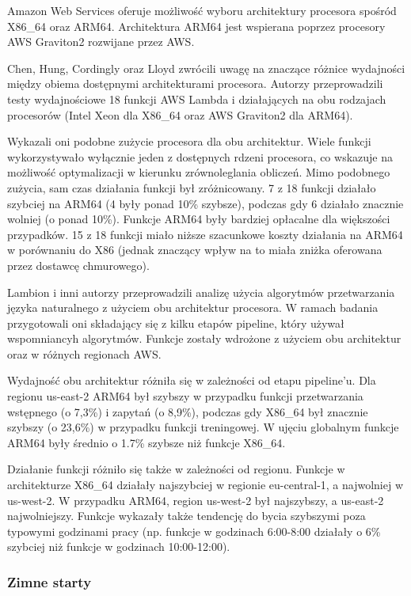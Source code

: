 Amazon Web Services oferuje możliwość wyboru architektury procesora spośród X86\_64 oraz ARM64. Architektura ARM64 jest wspierana poprzez procesory AWS Graviton2 rozwijane przez AWS.

Chen, Hung, Cordingly oraz Lloyd \cite{10.1145/3631295.3631394} zwrócili uwagę na znaczące różnice wydajności między obiema dostępnymi architekturami procesora. Autorzy przeprowadzili testy wydajnościowe 18 funkcji AWS Lambda i działających na obu rodzajach procesorów (Intel Xeon dla X86\_64 oraz AWS Graviton2 dla ARM64). 

Wykazali oni podobne zużycie procesora dla obu architektur. Wiele funkcji wykorzystywało wyłącznie jeden z dostępnych rdzeni procesora, co wskazuje na możliwość optymalizacji w kierunku zrównoleglania obliczeń. 
Mimo podobnego zużycia, sam czas działania funkcji był zróżnicowany. 
7 z 18 funkcji działało szybciej na ARM64 (4 były ponad 10\% szybsze), podczas gdy 6 działało znacznie wolniej (o ponad 10\%). 
Funkcje ARM64 były bardziej opłacalne dla większości przypadków. 15 z 18 funkcji miało niższe szacunkowe koszty działania na ARM64 w porównaniu do X86 (jednak znaczący wpływ na to miała zniżka oferowana przez dostawcę chmurowego).

Lambion i inni autorzy \cite{10.1145/3491204.3543506} przeprowadzili analizę użycia algorytmów przetwarzania języka naturalnego z użyciem obu architektur procesora. W ramach badania przygotowali oni składający się z kilku etapów pipeline, który używał wspomniancyh algorytmów. Funkcje zostały wdrożone z użyciem obu architektur oraz w różnych regionach AWS.

Wydajność obu architektur różniła się w zależności od etapu pipeline’u. Dla regionu us-east-2 ARM64 był szybszy w przypadku funkcji przetwarzania wstępnego (o 7,3\%) i zapytań (o 8,9\%), podczas gdy X86\_64 był znacznie szybszy (o 23,6\%) w przypadku funkcji treningowej. W ujęciu globalnym funkcje ARM64 były średnio o 1.7\% szybsze niż funkcje X86\_64.

Działanie funkcji różniło się także w zależności od regionu. Funkcje w architekturze X86\_64 działały najszybciej w regionie eu-central-1, a najwolniej w us-west-2. W przypadku ARM64, region us-west-2 był najszybszy, a us-east-2 najwolniejszy. Funkcje wykazały także tendencję do bycia szybszymi poza typowymi godzinami pracy (np. funkcje w godzinach 6:00-8:00 działały o 6\% szybciej niż funkcje w godzinach 10:00-12:00).

\subsubsection*{Zimne starty}

